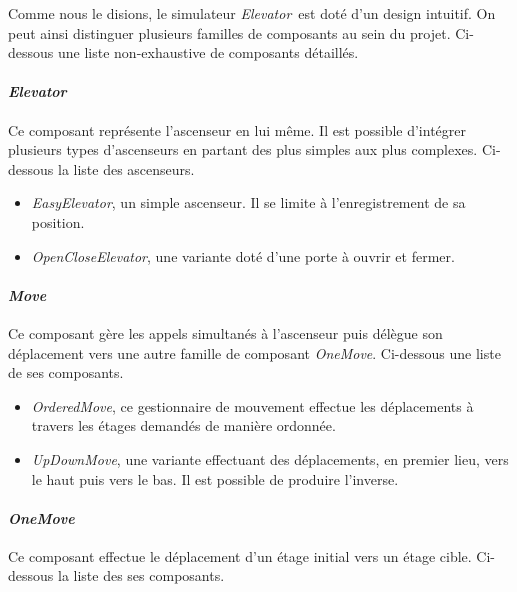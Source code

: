 \documentclass[twocolumn,oneside,10pt]{article}
\newcommand {\elevator}   {{\em Elevator}}
\begin{document}
Comme nous le disions, le simulateur \elevator\ est doté d'un design intuitif. On peut ainsi distinguer plusieurs familles de composants au sein du projet. Ci-dessous une liste non-exhaustive de composants détaillés.

\paragraph{\em Elevator}

Ce composant représente l'ascenseur en lui même. Il est possible d'intégrer plusieurs types d'ascenseurs en partant des plus simples aux plus complexes. Ci-dessous la liste des ascenseurs.\\

\begin{itemize}
\item {\em EasyElevator}, un simple ascenseur. Il se limite à l'enregistrement de sa position.\\
\item {\em OpenCloseElevator}, une variante doté d'une porte à ouvrir et fermer.
\end{itemize}

\paragraph{\em Move}

Ce composant gère les appels simultanés à l'ascenseur puis délègue son déplacement vers une autre famille de composant {\em OneMove}. Ci-dessous une liste de ses composants.\\

\begin{itemize}
\item {\em OrderedMove}, ce gestionnaire de mouvement effectue les déplacements à travers les étages demandés de manière ordonnée.\\
\item {\em UpDownMove}, une variante effectuant des déplacements, en premier lieu, vers le haut puis vers le bas. Il est possible de produire l'inverse.
\end{itemize}

\paragraph{\em OneMove}

Ce composant effectue le déplacement d'un étage initial vers un étage cible. Ci-dessous la liste des ses composants.\\
\end{document}
